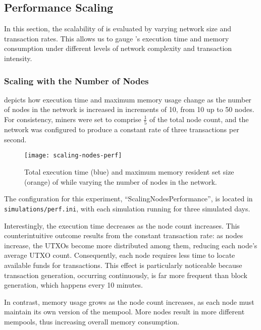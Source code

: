 \subsection{Performance Scaling}\label{subsec:performance-scaling}

In this section, the scalability of \iblock{} is evaluated by varying network
size and transaction rates. This allows us to gauge \iblock{}'s execution time
and memory consumption under different levels of network complexity and
transaction intensity.

\subsubsection{Scaling with the Number of Nodes}\label{subsubsec:scaling-nodes}

 depicts how execution time and maximum memory usage
change as the number of nodes in the network is increased in increments of 10,
from 10 up to 50 nodes. For consistency, miners were set to comprise
\(\frac{1}{5}\) of the total node count, and the network was configured to
produce a constant rate of three transactions per second.

\begin{figure}[tbhp]
	\centering
	\texttt{[image: scaling-nodes-perf]}
	\caption{Total execution time (blue) and maximum memory resident set
	size (orange) of \iblock{} while varying the number of nodes in the
	network.}\label{fig:scaling-nodes}
\end{figure}

The configuration for this experiment, ``ScalingNodesPerformance'', is located
in \texttt{simulations/perf.ini}, with each simulation running for three
simulated days.

Interestingly, the execution time decreases as the node count increases. This
counterintuitive outcome results from the constant transaction rate: as nodes
increase, the UTXOs become more distributed among them, reducing each node's
average UTXO count. Consequently, each node requires less time to locate
available funds for transactions. This effect is particularly noticeable
because transaction generation, occurring continuously, is far more frequent
than block generation, which happens every 10 minutes.

In contrast, memory usage grows as the node count increases, as each node must
maintain its own version of the mempool. More nodes result in more different
mempools, thus increasing overall memory consumption.

